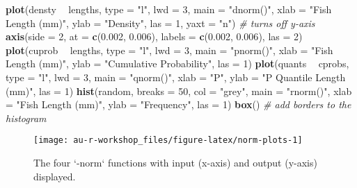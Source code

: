 \documentclass[]{book}
\newenvironment{Shaded}{\begin{snugshade}}{\end{snugshade}}
\newcommand{\KeywordTok}[1]{\textcolor[rgb]{0.13,0.29,0.53}{\textbf{#1}}}
\newcommand{\DataTypeTok}[1]{\textcolor[rgb]{0.13,0.29,0.53}{#1}}
\newcommand{\DecValTok}[1]{\textcolor[rgb]{0.00,0.00,0.81}{#1}}
\newcommand{\FloatTok}[1]{\textcolor[rgb]{0.00,0.00,0.81}{#1}}
\newcommand{\StringTok}[1]{\textcolor[rgb]{0.31,0.60,0.02}{#1}}
\newcommand{\CommentTok}[1]{\textcolor[rgb]{0.56,0.35,0.01}{\textit{#1}}}
\newcommand{\OperatorTok}[1]{\textcolor[rgb]{0.81,0.36,0.00}{\textbf{#1}}}
\newcommand{\NormalTok}[1]{#1}
\theoremstyle{definition}
\theoremstyle{definition}
\theoremstyle{definition}
\theoremstyle{remark}
\begin{document}
\begin{Shaded}
\begin{Highlighting}[]
\KeywordTok{plot}\NormalTok{(densty }\OperatorTok{~}\StringTok{ }\NormalTok{lengths, }\DataTypeTok{type =} \StringTok{"l"}\NormalTok{, }\DataTypeTok{lwd =} \DecValTok{3}\NormalTok{, }\DataTypeTok{main =} \StringTok{"dnorm()"}\NormalTok{,}
     \DataTypeTok{xlab =} \StringTok{"Fish Length (mm)"}\NormalTok{, }\DataTypeTok{ylab =} \StringTok{"Density"}\NormalTok{, }\DataTypeTok{las =} \DecValTok{1}\NormalTok{,}
     \DataTypeTok{yaxt =} \StringTok{"n"}\NormalTok{) }\CommentTok{# turns off y-axis}
\KeywordTok{axis}\NormalTok{(}\DataTypeTok{side =} \DecValTok{2}\NormalTok{, }\DataTypeTok{at =} \KeywordTok{c}\NormalTok{(}\FloatTok{0.002}\NormalTok{, }\FloatTok{0.006}\NormalTok{), }\DataTypeTok{labels =} \KeywordTok{c}\NormalTok{(}\FloatTok{0.002}\NormalTok{, }\FloatTok{0.006}\NormalTok{), }\DataTypeTok{las =} \DecValTok{2}\NormalTok{)}
\KeywordTok{plot}\NormalTok{(cuprob }\OperatorTok{~}\StringTok{ }\NormalTok{lengths, }\DataTypeTok{type =} \StringTok{"l"}\NormalTok{, }\DataTypeTok{lwd =} \DecValTok{3}\NormalTok{, }\DataTypeTok{main =} \StringTok{"pnorm()"}\NormalTok{,}
     \DataTypeTok{xlab =} \StringTok{"Fish Length (mm)"}\NormalTok{, }\DataTypeTok{ylab =} \StringTok{"Cumulative Probability"}\NormalTok{, }\DataTypeTok{las =} \DecValTok{1}\NormalTok{)}
\KeywordTok{plot}\NormalTok{(quants }\OperatorTok{~}\StringTok{ }\NormalTok{cprobs, }\DataTypeTok{type =} \StringTok{"l"}\NormalTok{, }\DataTypeTok{lwd =} \DecValTok{3}\NormalTok{, }\DataTypeTok{main =} \StringTok{"qnorm()"}\NormalTok{,}
     \DataTypeTok{xlab =} \StringTok{"P"}\NormalTok{, }\DataTypeTok{ylab =} \StringTok{"P Quantile Length (mm)"}\NormalTok{, }\DataTypeTok{las =} \DecValTok{1}\NormalTok{)}
\KeywordTok{hist}\NormalTok{(random, }\DataTypeTok{breaks =} \DecValTok{50}\NormalTok{, }\DataTypeTok{col =} \StringTok{"grey"}\NormalTok{, }\DataTypeTok{main =} \StringTok{"rnorm()"}\NormalTok{,}
     \DataTypeTok{xlab =} \StringTok{"Fish Length (mm)"}\NormalTok{, }\DataTypeTok{ylab =} \StringTok{"Frequency"}\NormalTok{, }\DataTypeTok{las =} \DecValTok{1}\NormalTok{)}
\KeywordTok{box}\NormalTok{() }\CommentTok{# add borders to the histogram}
\end{Highlighting}
\end{Shaded}

\begin{figure}

{\centering \texttt{[image: au-r-workshop\_files/figure-latex/norm-plots-1]} 

}

\caption{The four `-norm` functions with input (x-axis) and output (y-axis) displayed.}\label{fig:norm-plots}
\end{figure}
\end{document}

